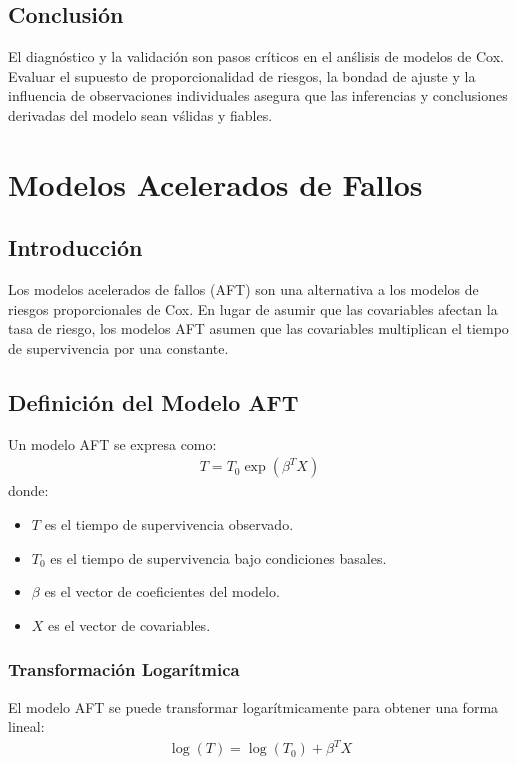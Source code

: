 \documentclass[a4paper]{report} %
\begin{document}
\section{Conclusi\'on}
El diagn\'ostico y la validaci\'on son pasos cr\'iticos en el an\'slisis de modelos de Cox. Evaluar el supuesto de proporcionalidad de riesgos, la bondad de ajuste y la influencia de observaciones individuales asegura que las inferencias y conclusiones derivadas del modelo sean v\'slidas y fiables.


\chapter{Modelos Acelerados de Fallos}

\section{Introducci\'on}
Los modelos acelerados de fallos (AFT) son una alternativa a los modelos de riesgos proporcionales de Cox. En lugar de asumir que las covariables afectan la tasa de riesgo, los modelos AFT asumen que las covariables multiplican el tiempo de supervivencia por una constante.

\section{Definici\'on del Modelo AFT}
Un modelo AFT se expresa como:
\begin{eqnarray*}
T = T_0 \exp(\beta^T X)
\end{eqnarray*}
donde:
\begin{itemize}
    \item $T$ es el tiempo de supervivencia observado.
    \item $T_0$ es el tiempo de supervivencia bajo condiciones basales.
    \item $\beta$ es el vector de coeficientes del modelo.
    \item $X$ es el vector de covariables.
\end{itemize}

\subsection{Transformaci\'on Logar\'itmica}
El modelo AFT se puede transformar logar\'itmicamente para obtener una forma lineal:
\begin{eqnarray*}
\log(T) = \log(T_0) + \beta^T X
\end{eqnarray*}
\end{document}

